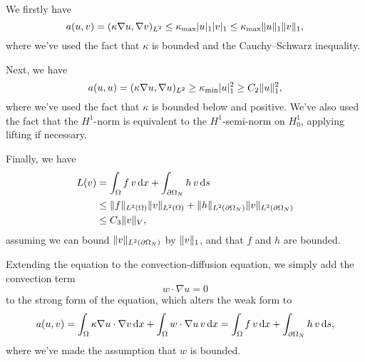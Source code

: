 We firstly have
\begin{equation}
    a(u, v) = (\kappa \nabla u, \nabla v)_{L^2} \leq \kappa_{\max} \lvert u\rvert_1 \lvert v\rvert_1 \leq \kappa_{\max} \lVert u\rVert_1 \lVert v\rVert_1,
\end{equation}
where we've used the fact that $\kappa$ is bounded and the Cauchy--Schwarz inequality.

Next, we have
\begin{equation}
    a(u, u) = (\kappa \nabla u, \nabla u)_{L^2} \geq \kappa_{\min} \lvert u\rvert_1^2 \geq C_2 \lVert u\rVert_1^2,
\end{equation}
where we've used the fact that $\kappa$ is bounded below and positive.
We've also used the fact that the $H^1$-norm is equivalent to the $H^1$-semi-norm on $H^1_0$, applying lifting if necessary.

Finally, we have
\begin{align*}
    L(v) &= \int_{\Omega} f \, v \mathop{}\!\mathrm{d} x + \int_{\partial\Omega_N} h \, v \mathop{}\!\mathrm{d} s \\
    &\leq \lVert f\rVert_{L^2(\Omega)} \lVert v\rVert_{L^2(\Omega)} + \lVert h\rVert_{L^2(\partial\Omega_N)} \lVert v\rVert_{L^2(\partial\Omega_N)} \\
    &\leq C_3 \lVert v\rVert_V,
\end{align*}
assuming we can bound $\lVert v\rVert_{L^2(\partial\Omega_N)}$ by $\lVert v\rVert_1$, and that $f$ and $h$ are bounded.

Extending the equation to the convection-diffusion equation, we simply add the convection term
\begin{equation}
    w \cdot \nabla u = 0
\end{equation}
to the strong form of the equation, which alters the weak form to
\begin{equation}
    a(u, v) = \int_{\Omega} \kappa \nabla u \cdot \nabla v \mathop{}\!\mathrm{d} x + \int_{\Omega} w \cdot \nabla u\, v \mathop{}\!\mathrm{d} x = \int_{\Omega} f \, v \mathop{}\!\mathrm{d} x + \int_{\partial\Omega_N} h \, v \mathop{}\!\mathrm{d} s,
\end{equation}
where we've made the assumption that $w$ is bounded.


